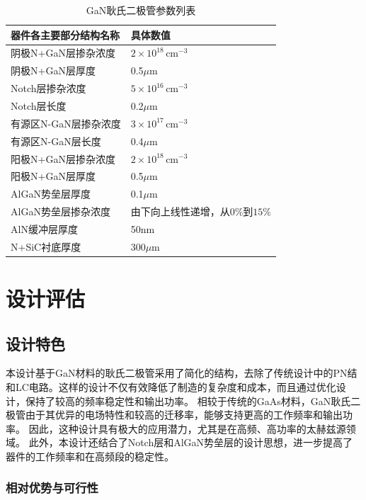 \documentclass[12pt,hyperref,a4paper,UTF8]{ctexart}
\begin{document}
\begin{table}[h]
\centering
\caption{GaN耿氏二极管参数列表}
\begin{tabular}{|l|l|}
\hline
器件各主要部分结构名称 & 具体数值 \\ \hline
阴极N+GaN层掺杂浓度 & $2 \times 10^{18} \, \text{cm}^{-3}$ \\ \hline
阴极N+GaN层厚度 & 0.5$\mu$m \\ \hline
Notch层掺杂浓度 & $5 \times 10^{16} \, \text{cm}^{-3}$ \\ \hline
Notch层长度 & 0.2$\mu$m \\ \hline
有源区N-GaN层掺杂浓度 & $3 \times 10^{17} \, \text{cm}^{-3}$ \\ \hline
有源区N-GaN层长度 & 0.4$\mu$m \\ \hline
阳极N+GaN层掺杂浓度 & $2 \times 10^{18} \, \text{cm}^{-3}$ \\ \hline
阳极N+GaN层厚度 & 0.5$\mu$m \\ \hline
AlGaN势垒层厚度 & 0.1$\mu$m \\ \hline
AlGaN势垒层掺杂浓度 & 由下向上线性递增，从$0\%$到$15\%$ \\ \hline
AlN缓冲层厚度 & 50nm \\ \hline
N+SiC衬底厚度 & 300$\mu$m \\ \hline
\end{tabular}
\end{table}


\newpage
\section{设计评估}


\subsection{设计特色}

本设计基于GaN材料的耿氏二极管采用了简化的结构，去除了传统设计中的PN结和LC电路。这样的设计不仅有效降低了制造的复杂度和成本，而且通过优化设计，保持了较高的频率稳定性和输出功率。
相较于传统的GaAs材料，GaN耿氏二极管由于其优异的电场特性和较高的迁移率，能够支持更高的工作频率和输出功率。
因此，这种设计具有极大的应用潜力，尤其是在高频、高功率的太赫兹源领域。
此外，本设计还结合了Notch层和AlGaN势垒层的设计思想，进一步提高了器件的工作频率和在高频段的稳定性。
\subsubsection*{相对优势与可行性}
\end{document}
